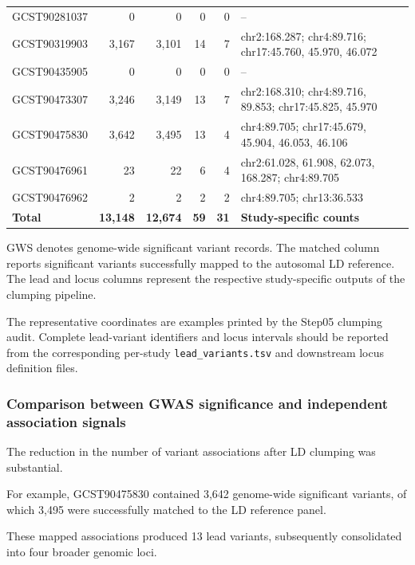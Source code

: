 \documentclass[11pt,a4paper]{article}
\begin{document}
\begin{longtable}{@{}lrrrrp{5.6cm}@{}}
GCST90281037 &
0 & 0 & 0 & 0 &
-- \\

GCST90319903 &
3,167 & 3,101 & 14 & 7 &
chr2:168.287;
chr4:89.716;
chr17:45.760, 45.970, 46.072 \\

GCST90435905 &
0 & 0 & 0 & 0 &
-- \\

GCST90473307 &
3,246 & 3,149 & 13 & 7 &
chr2:168.310;
chr4:89.716, 89.853;
chr17:45.825, 45.970 \\

GCST90475830 &
3,642 & 3,495 & 13 & 4 &
chr4:89.705;
chr17:45.679, 45.904, 46.053, 46.106 \\

GCST90476961 &
23 & 22 & 6 & 4 &
chr2:61.028, 61.908, 62.073, 168.287;
chr4:89.705 \\

GCST90476962 &
2 & 2 & 2 & 2 &
chr4:89.705;
chr13:36.533 \\

\midrule
\textbf{Total} &
\textbf{13,148} &
\textbf{12,674} &
\textbf{59} &
\textbf{31} &
\textbf{Study-specific counts} \\

\end{longtable}
\endgroup

GWS denotes genome-wide significant variant records.
The matched column reports significant variants
successfully mapped to the autosomal LD reference.
The lead and locus columns represent the respective
study-specific outputs of the clumping pipeline.

The representative coordinates are examples printed
by the Step05 clumping audit. Complete lead-variant
identifiers and locus intervals should be reported
from the corresponding per-study
\texttt{lead\_variants.tsv} and downstream locus
definition files.

\subsubsection{Comparison between GWAS significance
and independent association signals}

The reduction in the number of variant associations
after LD clumping was substantial.

For example, GCST90475830 contained 3,642
genome-wide significant variants, of which
3,495 were successfully matched to the LD
reference panel.

These mapped associations produced 13 lead
variants, subsequently consolidated into
four broader genomic loci.
\end{document}
